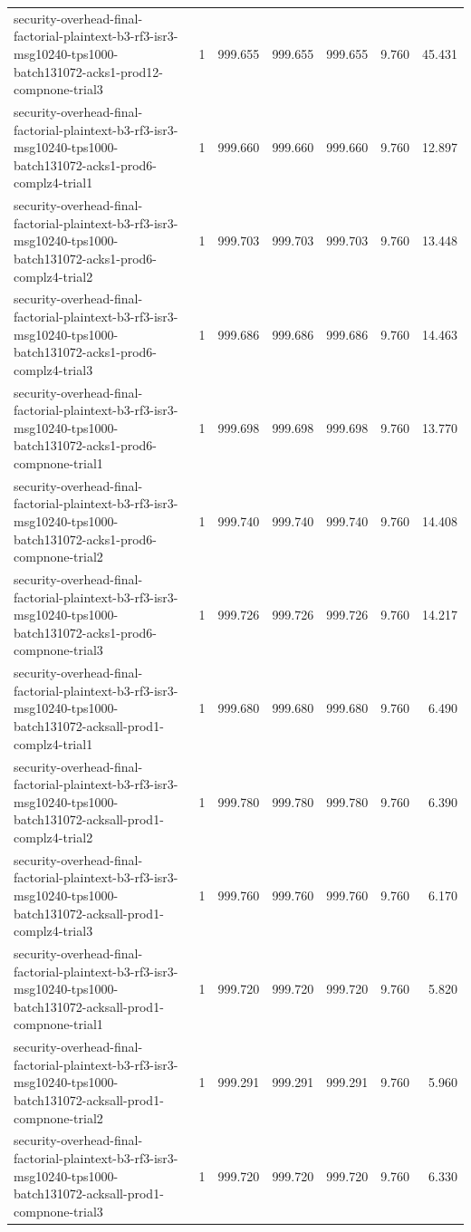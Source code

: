 \begin{tabular}{lrrrrrr}
security-overhead-final-factorial-plaintext-b3-rf3-isr3-msg10240-tps1000-batch131072-acks1-prod12-compnone-trial3 & 1 & 999.655 & 999.655 & 999.655 & 9.760 & 45.431 \\
security-overhead-final-factorial-plaintext-b3-rf3-isr3-msg10240-tps1000-batch131072-acks1-prod6-complz4-trial1 & 1 & 999.660 & 999.660 & 999.660 & 9.760 & 12.897 \\
security-overhead-final-factorial-plaintext-b3-rf3-isr3-msg10240-tps1000-batch131072-acks1-prod6-complz4-trial2 & 1 & 999.703 & 999.703 & 999.703 & 9.760 & 13.448 \\
security-overhead-final-factorial-plaintext-b3-rf3-isr3-msg10240-tps1000-batch131072-acks1-prod6-complz4-trial3 & 1 & 999.686 & 999.686 & 999.686 & 9.760 & 14.463 \\
security-overhead-final-factorial-plaintext-b3-rf3-isr3-msg10240-tps1000-batch131072-acks1-prod6-compnone-trial1 & 1 & 999.698 & 999.698 & 999.698 & 9.760 & 13.770 \\
security-overhead-final-factorial-plaintext-b3-rf3-isr3-msg10240-tps1000-batch131072-acks1-prod6-compnone-trial2 & 1 & 999.740 & 999.740 & 999.740 & 9.760 & 14.408 \\
security-overhead-final-factorial-plaintext-b3-rf3-isr3-msg10240-tps1000-batch131072-acks1-prod6-compnone-trial3 & 1 & 999.726 & 999.726 & 999.726 & 9.760 & 14.217 \\
security-overhead-final-factorial-plaintext-b3-rf3-isr3-msg10240-tps1000-batch131072-acksall-prod1-complz4-trial1 & 1 & 999.680 & 999.680 & 999.680 & 9.760 & 6.490 \\
security-overhead-final-factorial-plaintext-b3-rf3-isr3-msg10240-tps1000-batch131072-acksall-prod1-complz4-trial2 & 1 & 999.780 & 999.780 & 999.780 & 9.760 & 6.390 \\
security-overhead-final-factorial-plaintext-b3-rf3-isr3-msg10240-tps1000-batch131072-acksall-prod1-complz4-trial3 & 1 & 999.760 & 999.760 & 999.760 & 9.760 & 6.170 \\
security-overhead-final-factorial-plaintext-b3-rf3-isr3-msg10240-tps1000-batch131072-acksall-prod1-compnone-trial1 & 1 & 999.720 & 999.720 & 999.720 & 9.760 & 5.820 \\
security-overhead-final-factorial-plaintext-b3-rf3-isr3-msg10240-tps1000-batch131072-acksall-prod1-compnone-trial2 & 1 & 999.291 & 999.291 & 999.291 & 9.760 & 5.960 \\
security-overhead-final-factorial-plaintext-b3-rf3-isr3-msg10240-tps1000-batch131072-acksall-prod1-compnone-trial3 & 1 & 999.720 & 999.720 & 999.720 & 9.760 & 6.330 \\

\end{tabular}
